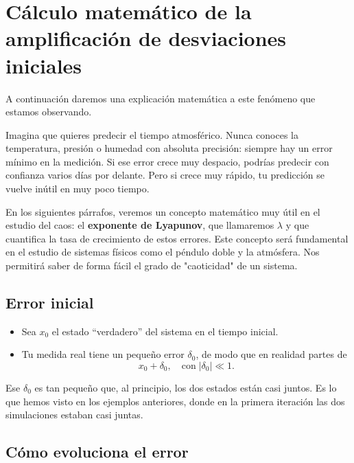 \documentclass[
  10pt,
  a4paper,
  DIV=11,
  numbers=noendperiod,
  open=any]{scrreprt}
\providecommand{\tightlist}{%
  \setlength{\itemsep}{0pt}\setlength{\parskip}{0pt}}
\numberwithin{equation}{chapter}
\numberwithin{equation}{section}
\renewcommand{\[}{\begin{equation}}
\renewcommand{\]}{\end{equation}}
\begin{document}
\section{Cálculo matemático de la amplificación de desviaciones
iniciales}\label{cuxe1lculo-matemuxe1tico-de-la-amplificaciuxf3n-de-desviaciones-iniciales}

A continuación daremos una explicación matemática a este fenómeno que
estamos observando.

Imagina que quieres predecir el tiempo atmosférico. Nunca conoces la
temperatura, presión o humedad con absoluta precisión: siempre hay un
error mínimo en la medición. Si ese error crece muy despacio, podrías
predecir con confianza varios días por delante. Pero si crece muy
rápido, tu predicción se vuelve inútil en muy poco tiempo.

En los siguientes párrafos, veremos un concepto matemático muy útil en el
estudio del caos: el \textbf{exponente de Lyapunov}, que llamaremos
\(\lambda\) y que cuantifica la tasa de crecimiento de estos errores. Este concepto será fundamental en el estudio de sistemas físicos como el péndulo doble y la atmósfera. Nos permitirá saber de forma fácil el grado de "caoticidad" de un sistema. 

\subsection{Error inicial}\label{error-inicial}

\begin{itemize}
\tightlist
\item
  Sea \(x_0\) el estado ``verdadero'' del sistema en el tiempo
  inicial.\\
\item
  Tu medida real tiene un pequeño error \(\delta_0\), de modo que en
  realidad partes de\\
  \[
     x_0 + \delta_0,
     \quad\text{con}\;|\delta_0|\ll 1.
   \]
\end{itemize}

Ese \(\delta_0\) es tan pequeño que, al principio, los dos estados están
casi juntos. Es lo que hemos visto en los ejemplos anteriores, donde en
la primera iteración las dos simulaciones estaban casi juntas.

\subsection{Cómo evoluciona el error}\label{cuxf3mo-evoluciona-el-error}
\end{document}

